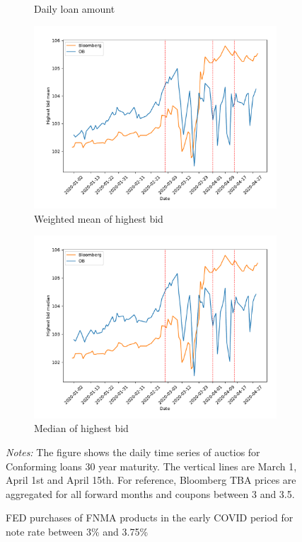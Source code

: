 \documentclass[11pt,a4paper]{article}
\begin{document}
\begin{figure}[h]
\begin{subfigure}[b]{0.49\textwidth}
      \caption{ Daily loan amount}
     \end{subfigure}
     \begin{subfigure}[b]{0.49\textwidth}
      \includegraphics[width=0.998\textwidth]{../results/figures/w_winner_bid_mean_mat30_loan1_timeseries_nr_3_3.75.pdf}
      \caption{ Weighted mean of highest bid}
     \end{subfigure}
     \begin{subfigure}[b]{0.49\textwidth}
      \includegraphics[width=0.998\textwidth]{../results/figures/winner_bid_median_mat30_loan1_timeseries_nr_3_3.75.pdf}
      \caption{ Median of highest bid}
     \end{subfigure}
   \caption{FED purchases of FNMA products in the early COVID period for note rate between 3\% and 3.75\%}
   \begin{minipage}{\textwidth}
      \footnotesize{\textit{Notes:} The figure shows the daily time series of auctios for Conforming loans 30 year maturity. The vertical lines are March 1, April 1st and April 15th. For reference, Bloomberg TBA prices are aggregated for all forward months and coupons between 3 and 3.5. } 
      \end{minipage}
\end{figure}
\end{document}
